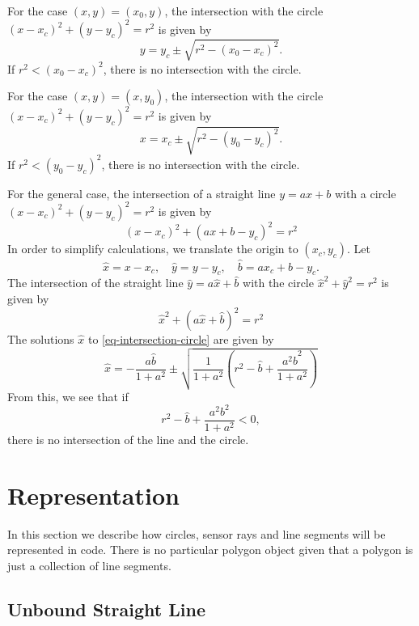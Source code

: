 \documentclass[11pt]{article}
\newcommand{\bhat}{{\hat{b}}}
\newcommand{\xhat}{{\hat{x}}}
\newcommand{\yhat}{{\hat{y}}}
\begin{document}
For the case $(x,y)=(x_0, y)$, the intersection with the circle
$(x-x_c)^2+(y-y_c)^2=r^2$ is given by
\begin{equation}
    y = y_c \pm\sqrt{r^2 - (x_0-x_c)^2}.
\end{equation}
If $r^2 < (x_0-x_c)^2$, there is no intersection with the circle.

For the case $(x,y)=(x, y_0)$, the intersection with the circle
$(x-x_c)^2+(y-y_c)^2=r^2$ is given by
\begin{equation}
    x = x_c \pm\sqrt{r^2 - (y_0-y_c)^2}.
\end{equation}
If $r^2 < (y_0-y_c)^2$, there is no intersection with the circle.

For the general case, the intersection of a
straight line $y=ax+b$ with a circle $(x-x_c)^2+(y-y_c)^2=r^2$ is given by
\begin{equation}
    (x-x_c)^2 + (ax+b - y_c)^2 = r^2
\end{equation}
In order to simplify calculations, we translate the origin to $(x_c, y_c)$. Let
\begin{equation}
    \xhat = x-x_c,\quad \yhat = y-y_c,\quad \bhat = ax_c + b - y_c.
\end{equation}
The intersection of the straight line $\yhat = a\xhat + \bhat$ with the circle
$\xhat^2 + \yhat^2 = r^2$ is given by
\begin{equation}
    \xhat^2 + (a\xhat + \bhat)^2 = r^2 \label{eq-intersection-circle}
\end{equation}
The solutions $\xhat$ to \eqref{eq-intersection-circle} are given by
\begin{equation}
    \xhat = -\frac{a\bhat}{1+a^2}\pm
        \sqrt{\frac{1}{1+a^2}\left(r^2-\bhat+\frac{a^2 \bhat^2}{1+a^2}\right)}
\end{equation}
From this, we see that if
\begin{equation}
    r^2-\bhat+\frac{a^2 b^2}{1+a^2} < 0,
\end{equation}
there is no intersection of the line and the circle.

\section{Representation}
\label{sec-representation}
In this section we describe how circles, sensor rays and line segments will be
represented in code. There is no particular polygon object given that a
polygon is just a collection of line segments.

\subsection{Unbound Straight Line}
\end{document}
